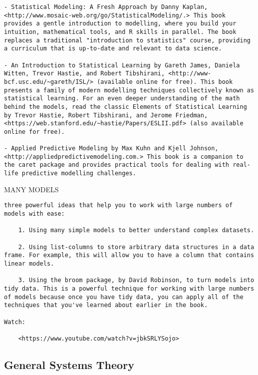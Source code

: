 \documentclass[
]{book}
\begin{document}
\begin{verbatim}
- Statistical Modeling: A Fresh Approach by Danny Kaplan, <http://www.mosaic-web.org/go/StatisticalModeling/.> This book provides a gentle introduction to modelling, where you build your intuition, mathematical tools, and R skills in parallel. The book replaces a traditional "introduction to statistics" course, providing a curriculum that is up-to-date and relevant to data science.

- An Introduction to Statistical Learning by Gareth James, Daniela Witten, Trevor Hastie, and Robert Tibshirani, <http://www-bcf.usc.edu/~gareth/ISL/> (available online for free). This book presents a family of modern modelling techniques collectively known as statistical learning. For an even deeper understanding of the math behind the models, read the classic Elements of Statistical Learning by Trevor Hastie, Robert Tibshirani, and Jerome Friedman, <https://web.stanford.edu/~hastie/Papers/ESLII.pdf> (also available online for free).

- Applied Predictive Modeling by Max Kuhn and Kjell Johnson, <http://appliedpredictivemodeling.com.> This book is a companion to the caret package and provides practical tools for dealing with real-life predictive modelling challenges.
\end{verbatim}

MANY MODELS

\begin{verbatim}
three powerful ideas that help you to work with large numbers of models with ease:

    1. Using many simple models to better understand complex datasets.

    2. Using list-columns to store arbitrary data structures in a data frame. For example, this will allow you to have a column that contains linear models.

    3. Using the broom package, by David Robinson, to turn models into tidy data. This is a powerful technique for working with large numbers of models because once you have tidy data, you can apply all of the techniques that you've learned about earlier in the book.

Watch:

    <https://www.youtube.com/watch?v=jbkSRLYSojo>
\end{verbatim}

\hypertarget{general-systems-theory}{%
\subsection{General Systems Theory}\label{general-systems-theory}}
\end{document}
